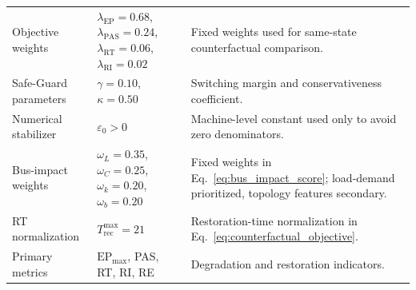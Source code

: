 \begin{table}[t]
\begin{tabular}{p{} p{} p{}}
\rowcolor{RowPhysical}
Objective weights & $\lambda_{\mathrm{EP}}=0.68$, $\lambda_{\mathrm{PAS}}=0.24$, $\lambda_{\mathrm{RT}}=0.06$, $\lambda_{\mathrm{RI}}=0.02$ & Fixed weights used for same-state counterfactual comparison. \\
\rowcolor{RowRisk}
Safe-Guard parameters & $\gamma=0.10$, $\kappa=0.50$ & Switching margin and conservativeness coefficient. \\
\rowcolor{RowNeutral}
Numerical stabilizer & $\varepsilon_0>0$ & Machine-level constant used only to avoid zero denominators. \\
\rowcolor{RowScenario}
Bus-impact weights & $\omega_L=0.35$, $\omega_C=0.25$, $\omega_k=0.20$, $\omega_b=0.20$ & Fixed weights in Eq.~\eqref{eq:bus_impact_score}; load-demand prioritized, topology features secondary. \\
\rowcolor{RowPhysical}
RT normalization & $T_{\mathrm{rec}}^{\max}=21$ & Restoration-time normalization in Eq.~\eqref{eq:counterfactual_objective}. \\
\rowcolor{RowNeutral}
Primary metrics & $\mathrm{EP}_{\max}$, PAS, RT, RI, RE & Degradation and restoration indicators. \\
\bottomrule
\end{tabular}
\end{table}
